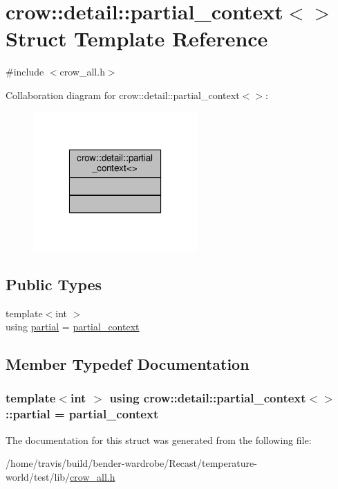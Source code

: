 \hypertarget{structcrow_1_1detail_1_1partial__context_3_4}{\section{crow\-:\-:detail\-:\-:partial\-\_\-context$<$$>$ Struct Template Reference}
\label{structcrow_1_1detail_1_1partial__context_3_4}
}


{\ttfamily \#include $<$crow\-\_\-all.\-h$>$}



Collaboration diagram for crow\-:\-:detail\-:\-:partial\-\_\-context$<$$>$\-:
\nopagebreak
\begin{figure}[H]
\begin{center}
\leavevmode
\includegraphics[width=178pt]{structcrow_1_1detail_1_1partial__context_3_4__coll__graph}
\end{center}
\end{figure}
\subsection*{Public Types}
\begin{DoxyCompactItemize}
\item 
{\footnotesize template$<$int $>$ }\\using \hyperlink{structcrow_1_1detail_1_1partial__context_3_4_a4c2945874debb1b522dd6f81ee5b7865}{partial} = \hyperlink{structcrow_1_1detail_1_1partial__context}{partial\-\_\-context}
\end{DoxyCompactItemize}


\subsection{Member Typedef Documentation}
\hypertarget{structcrow_1_1detail_1_1partial__context_3_4_a4c2945874debb1b522dd6f81ee5b7865}{
\subsubsection[{partial}]{\setlength{\rightskip}{0pt plus 5cm}template$<$int $>$ using {\bf crow\-::detail\-::partial\-\_\-context}$<$$>$\-::{\bf partial} =  {\bf partial\-\_\-context}}}\label{structcrow_1_1detail_1_1partial__context_3_4_a4c2945874debb1b522dd6f81ee5b7865}


The documentation for this struct was generated from the following file\-:\begin{DoxyCompactItemize}
\item 
/home/travis/build/bender-\/wardrobe/\-Recast/temperature-\/world/test/lib/\hyperlink{crow__all_8h}{crow\-\_\-all.\-h}\end{DoxyCompactItemize}
